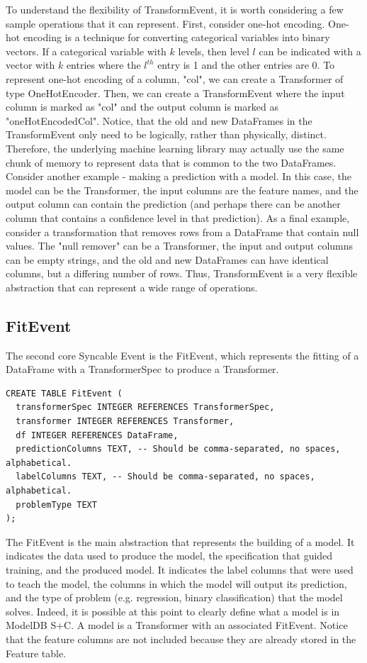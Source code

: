 To understand the flexibility of TransformEvent, it is worth considering a few
sample operations that it can represent. First, consider one-hot encoding. One-hot
encoding is a technique for converting categorical variables into binary vectors.
If a categorical variable with $k$ levels, then level $l$ can be indicated with
a vector with $k$ entries where the $l^{th}$ entry is 1 and the other entries are
0. To represent one-hot encoding of a column, "col", we can create a Transformer of
type OneHotEncoder. Then, we can create a TransformEvent where the input column
is marked as "col" and the output column is marked as "oneHotEncodedCol". Notice,
that the old and new DataFrames in the TransformEvent only need to be logically, rather
than physically, distinct. Therefore, the underlying machine learning library may
actually use the same chunk of memory to represent data that is common to the two 
DataFrames. Consider another example - making a prediction with a model. In this
case, the model can be the Transformer, the input columns are the feature names,
and the output column can contain the prediction (and perhaps there can be another
column that contains a confidence level in that prediction). As a final example,
consider a transformation that removes rows from a DataFrame that contain null values.
The "null remover" can be a Transformer, the input and output columns can be empty
strings, and the old and new DataFrames can have identical columns, but a differing
number of rows. Thus, TransformEvent is a very flexible abstraction that can represent
a wide range of operations.

\subsection{FitEvent}

The second core Syncable Event is the FitEvent, which represents the fitting of a
DataFrame with a TransformerSpec to produce a Transformer.

\begin{verbatim}
CREATE TABLE FitEvent (
  transformerSpec INTEGER REFERENCES TransformerSpec,
  transformer INTEGER REFERENCES Transformer,
  df INTEGER REFERENCES DataFrame,
  predictionColumns TEXT, -- Should be comma-separated, no spaces, alphabetical.
  labelColumns TEXT, -- Should be comma-separated, no spaces, alphabetical.
  problemType TEXT 
);
\end{verbatim}

The FitEvent is the main abstraction that represents the building of a model. It
indicates the data used to produce the model, the specification that guided training,
and the produced model. It indicates the label columns that were used to teach the
model, the columns in which the model will output its prediction, and the type of
problem (e.g. regression, binary classification) that the model solves. Indeed, it
is possible at this point to clearly define what a model is in ModelDB S+C. A model is
a Transformer with an associated FitEvent. 
Notice that the feature columns are not included because they are already stored in the Feature
table. 

